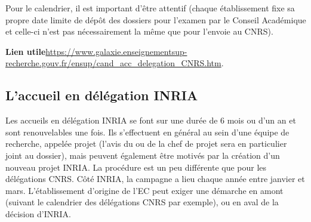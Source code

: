 Pour le calendrier, il est important d'être attentif (chaque \'etablissement fixe sa propre
date limite de d\'ep\^ot des dossiers pour l'examen par le Conseil
Acad\'emique et celle-ci n'est pas n\'ecessairement la même que pour l'envoie au CNRS). 

\textbf{Lien utile\hspace{0.5em}}\url{https://www.galaxie.enseignementsup-recherche.gouv.fr/ensup/cand_acc_delegation_CNRS.htm}.
% 
%
%
%
\subsection*{L'accueil en d\'el\'egation INRIA}


Les accueils en d\'el\'egation INRIA se font sur une dur\'ee de 6 mois ou
d'un an et sont renouvelables une fois. Ils s'effectuent en
g\'en\'eral au sein d'une \'equipe de recherche, appel\'ee projet
(l'avis du ou de la chef de projet sera en particulier joint au dossier),
mais peuvent \'egalement \^etre motiv\'es par la cr\'eation d'un
nouveau projet INRIA. La proc\'edure est un peu diff\'erente que
pour les d\'el\'egations CNRS. C\^ot\'e INRIA, la campagne a lieu chaque ann\'ee entre janvier et mars.
L'\'etablissement d'origine de l'EC peut exiger une d\'emarche en amont (suivant le calendrier des d\'el\'egations CNRS par exemple), 
ou en aval de la d\'ecision d'INRIA.

